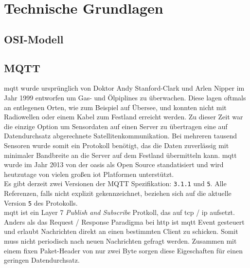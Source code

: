 \section{Technische Grundlagen} \label{s:basics}
\begin{comment}
TODO:
- im folgenden bezieht sich Client auf MQTT Client
- publishen / subscriben wird zu veröffentlichen / abonnieren
- herausgeber / abonnent wird zu publisher / subscriber
- Thema in Topic umändern

TODO Erklärung zu den einzelnen kapiteln und was sich darin befindet (in den grundlagen)
\end{comment}

\subsection{OSI-Modell} \label{s:osi-model}

\subsection{MQTT} \label{s:mqtt}
\acf{mqtt} wurde ursprünglich von Doktor Andy Stanford-Clark und Arlen Nipper im Jahr 1999 entworfen um Gas- und Ölpiplines zu überwachen. Diese lagen oftmals an entlegenen Orten, wie zum Beispiel auf Übersee, und konnten nicht mit Radiowellen oder einem Kabel zum Festland erreicht werden. Zu dieser Zeit war die einzige Option um Sensordaten auf einen Server zu übertragen eine auf Datendurchsatz abgerechnete Satellitenkommunikation. Bei mehreren tausend Sensoren wurde somit ein Protokoll benötigt, das die Daten zuverlässig mit minimaler Bandbreite an die Server auf dem Festland übermitteln kann.
\ac{mqtt} wurde im Jahr 2013 von der \ac{oasis} als Open Source standatisiert und wird heutzutage von vielen gro{\ss}en \ac{iot} Platformen unterstützt.
\cite{WhatMQTTDefinition}\\
Es gibt derzeit zwei Versionen der MQTT Spezifikation: \verb|3.1.1| und \verb|5|. Alle Referenzen, falls nicht explizit gekennzeichnet, beziehen sich auf die aktuelle Version \verb|5| des Protokolls.\\
\ac{mqtt} ist ein Layer 7 \textit{Publish and Subscribe} Protkoll, das auf \acs{tcp} / \acs{ip} aufsetzt. Anders als das Request / Response Paradigma bei \acs{http} ist \ac{mqtt} Event gesteuert und erlaubt Nachrichten direkt an einen bestimmten Client zu schicken. Somit muss nicht periodisch nach neuen Nachrichten gefragt werden. Zusammen mit einem fixen Paket-Header von nur zwei Byte sorgen diese Eigeschaften für einen geringen Datendurchsatz.\cite{WhatMQTTDefinition}

